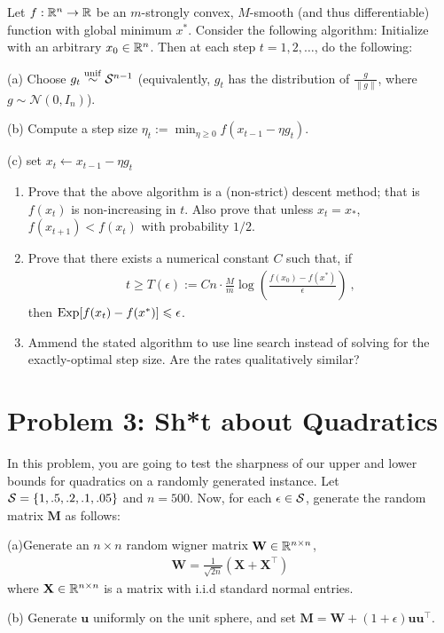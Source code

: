 \documentclass[12pt]{article}
\begin{document}
	Let $f: \mathbb{R}^n \to \mathbb{R}$ be an $m$-strongly convex, $M$-smooth (and thus differentiable) function with global minimum $x^*$. 
%
	Consider the following algorithm: Initialize with an arbitrary $x_0 \in \mathbb{R}^n$. 
%
	Then at each step $t = 1,2,\dots$, do the following: 

	(a) Choose $g_t \overset{\mathrm{unif}}{\sim} {\cal S}^{n-1}$ (equivalently, $g_t$ has the distribution of $\frac{g}{\|g\|}$, where $g\sim \mathcal{N}(0,I_n)$). 

	(b) Compute a step size $\eta_t := \min_{\eta \ge 0} f(x_{t-1}-\eta g_t)$.

	(c) set $x_t \leftarrow x_{t-1}-\eta g_t$

\begin{enumerate}
	\item Prove that the above algorithm is a (non-strict) descent method; that is $f(x_t)$ is non-increasing in $t$. Also prove that unless $x_t = x_*$, $f(x_{t+1}) < f(x_t)$ with probability $1/2$. 
	\item Prove that there exists a numerical constant $C$ such that, if 
	\begin{eqnarray}
	t \ge T(\epsilon) := C n \cdot \frac{M}{m} \log (\frac{f(x_0) - f(x^*)}{\epsilon})~,
	\end{eqnarray}
	then $\mathrm{Exp}[f(x_t) - f(x^*)] \leqslant \epsilon$. 
	\item Ammend the stated algorithm to use line search instead of solving for the exactly-optimal step size. Are the rates qualitatively similar?
\end{enumerate}
\section*{Problem 3: Sh*t about Quadratics}
	In this problem, you are going to test the sharpness of our upper and lower bounds for quadratics on a randomly generated instance. Let ${\cal S} = \{1,.5,.2,.1,.05\}$ and $n = 500$. Now, for each $\epsilon \in {\cal S}$, generate the random matrix $\mathbf{M}$ as follows: 

	(a)Generate an $n \times n$ random wigner matrix $\mathbf{W} \in \mathbb{R}^{n \times n}$, 
		\begin{eqnarray*}
		\mathbf{W} = \frac{1}{\sqrt{2n}} (\mathbf{X} + \mathbf{X}^{\top})
		\end{eqnarray*}
		where $\mathbf{X} \in \mathbb{R}^{n \times n}$ is a matrix with i.i.d standard normal entries. 
	
	(b) Generate $\mathbf{u}$ uniformly on the unit sphere, and set $\mathbf{M} = \mathbf{W} + (1 + \epsilon)\mathbf{u}\mathbf{u}^{\top}$. 
\end{document}
